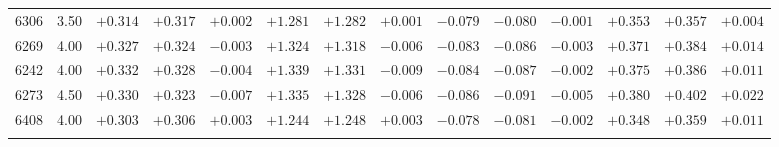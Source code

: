 \documentclass[]{aa}
\begin{document}
\begin{appendix}
\begin{table*}
\begin{center}
\begin{tabular}{llllllllllllll}
6306  &3.50 &$ +0.314$ &$ +0.317$ &$ +0.002$ &$ +1.281$ &$ +1.282$ &$ +0.001$ &$ -0.079$ &$ -0.080$ &$ -0.001$ &$ +0.353$ &$ +0.357$ &$ +0.004$\\
6269  &4.00 &$ +0.327$ &$ +0.324$ &$ -0.003$ &$ +1.324$ &$ +1.318$ &$ -0.006$ &$ -0.083$ &$ -0.086$ &$ -0.003$ &$ +0.371$ &$ +0.384$ &$ +0.014$\\
6242  &4.00 &$ +0.332$ &$ +0.328$ &$ -0.004$ &$ +1.339$ &$ +1.331$ &$ -0.009$ &$ -0.084$ &$ -0.087$ &$ -0.002$ &$ +0.375$ &$ +0.386$ &$ +0.011$\\
6273  &4.50 &$ +0.330$ &$ +0.323$ &$ -0.007$ &$ +1.335$ &$ +1.328$ &$ -0.006$ &$ -0.086$ &$ -0.091$ &$ -0.005$ &$ +0.380$ &$ +0.402$ &$ +0.022$\\
6408  &4.00 &$ +0.303$ &$ +0.306$ &$ +0.003$ &$ +1.244$ &$ +1.248$ &$ +0.003$ &$ -0.078$ &$ -0.081$ &$ -0.002$ &$ +0.348$ &$ +0.359$ &$ +0.011$\\
\hline\noalign{\smallskip}
\hline\noalign{\smallskip}
\end{tabular}
\end{center}
\end{table*}



\end{appendix}
\end{document}
